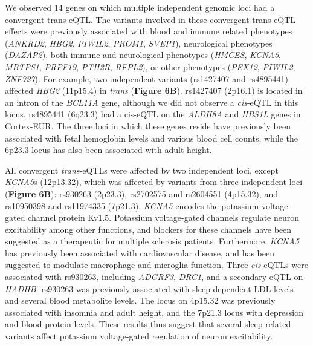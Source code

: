 We observed 14 genes on which multiple independent genomic loci had a convergent trans-eQTL. The variants involved in these convergent trans-eQTL effects were previously associated with blood and immune related phenotypes (\emph{ANKRD2}, \emph{HBG2}, \emph{PIWIL2}, \emph{PROM1}, \emph{SVEP1}), neurological phenotypes (\emph{DAZAP2}), both immune and neurological phenotypes (\emph{HMCES}, \emph{KCNA5}, \emph{MBTPS1}, \emph{PRPF19}, \emph{PTH2R}, \emph{RFPL2}), or other phenotypes (\emph{PEX12}, \emph{PIWIL2}, \emph{ZNF727}). For example, two independent variants (rs1427407 and rs4895441) affected \emph{HBG2} (11p15.4) in \emph{trans} (\textbf{Figure 6B}). rs1427407 (2p16.1) is located in an intron of the \emph{BCL11A} gene, although we did not observe a \emph{cis}-eQTL in this locus. rs4895441 (6q23.3) had a cis-eQTL on the \emph{ALDH8A} and \emph{HBS1L} genes in Cortex-EUR. The three loci in which these genes reside have previously been associated with fetal hemoglobin levels\cite{sankaranHumanFetalHemoglobin2008,jiangCMYBInvolvedRegulation2006,metaisGenomeEditingHBG12019} and various blood cell counts, while the 6p23.3 locus has also been associated with adult height\cite{wojcikGeneticAnalysesDiverse2019}.  

All convergent \emph{trans}-eQTLs were affected by two independent loci, except \emph{KCNA5}s (12p13.32), which was affected by variants from three independent loci (\textbf{Figure 6B}): rs930263 (2p23.3), rs2702575 and rs2604551 (4p15.32), and rs10950398 and rs11974335 (7p21.3). \emph{KCNA5} encodes the potassium voltage-gated channel protein Kv1.5. Potassium voltage-gated channels regulate neuron excitability among other functions, and blockers for these channels have been suggested as a therapeutic for multiple sclerosis patients\cite{jDalfampridineBriefReview2011}. Furthermore, \emph{KCNA5} has previously been associated with cardiovascular disease\cite{al-owaisMultipleMechanismsMediating2017}, and has been suggested to modulate macrophage and microglia function\cite{rusVoltagegatedPotassiumChannel2005}. Three \emph{cis}-eQTLs were associated with rs930263, including \emph{ADGRF3}, \emph{DRC1}, and a secondary eQTL on \emph{HADHB}. rs930263 was previously associated with sleep dependent LDL levels\cite{noordamMultiancestrySleepbySNPInteraction2019} and several blood metabolite levels\cite{galloisComprehensiveStudyMetabolite2019,sunGenomicAtlasHuman2018,suhreConnectingGeneticRisk2017,tinTargetGenesVariants2019}. The locus on 4p15.32 was previously associated with insomnia and adult height\cite{kichaevLeveragingPolygenicFunctional2019}, and the 7p21.3 locus with depression and blood protein levels. These results thus suggest that several sleep related variants affect potassium voltage-gated regulation of neuron excitability.  


